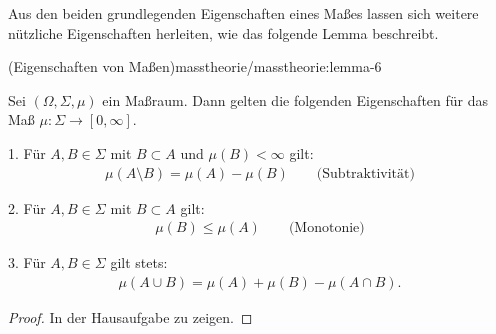 \documentclass[letterpaper,10pt,german]{jupyterBook}
\begin{document}
\par
Aus den beiden grundlegenden Eigenschaften eines Maßes lassen sich weitere nützliche Eigenschaften herleiten, wie das folgende Lemma beschreibt.
\begin{lemma}{(Eigenschaften von Maßen)}{masstheorie/masstheorie:lemma-6}



\par
Sei \((\Omega, \Sigma, \mu)\) ein Maßraum.
Dann gelten die folgenden Eigenschaften für das Maß \(\mu \colon \Sigma \rightarrow [0,\infty]\).

\par
1. Für \(A,B \in \Sigma\) mit \(B \subset A\) und \(\mu(B) < \infty\) gilt:
\begin{align*}
\mu(A \setminus B) = \mu(A) - \mu(B) \qquad \text{(Subtraktivität)}
\end{align*}
\par
2. Für \(A,B \in \Sigma\) mit \(B \subset A\) gilt:
\begin{align*}
\mu(B) \leq \mu(A) \qquad \text{(Monotonie)}
\end{align*}
\par
3. Für \(A,B \in \Sigma\) gilt stets:
\begin{align*}
\mu(A \cup B) = \mu(A) + \mu(B) - \mu(A \cap B).
\end{align*}\end{lemma}

\begin{proof}
 In der Hausaufgabe zu zeigen.
\end{proof}
\end{document}

